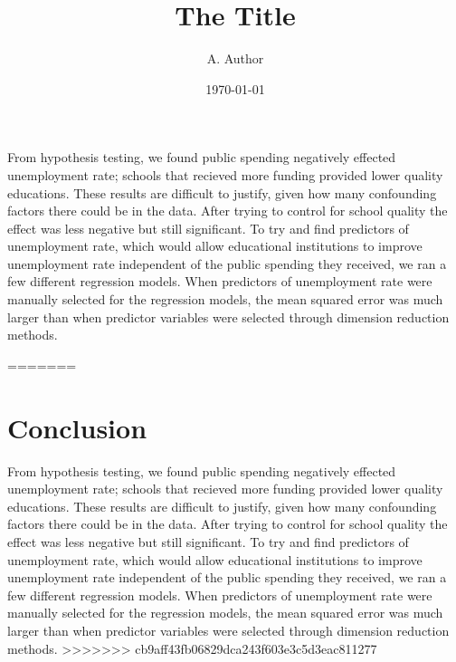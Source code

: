 \documentclass{article}
\begin{document}


\title{The Title}
\author{A. Author}
\date{\today}

\maketitle

From hypothesis testing, we found public spending negatively effected unemployment rate; schools that recieved more funding provided lower quality educations. These results are difficult to justify, given how many confounding factors there could be in the data. After trying to control for school quality the effect was less negative but still significant. To try and find predictors of unemployment rate, which would allow educational institutions to improve unemployment rate independent of the public spending they received, we ran a few different regression models. When predictors of unemployment rate were manually selected for the regression models, the mean squared error was much larger than when predictor variables were selected through dimension reduction methods. 

=======
\maketitle
\section{Conclusion}
From hypothesis testing, we found public spending negatively effected unemployment rate; schools that recieved more funding provided lower quality educations. These results are difficult to justify, given how many confounding factors there could be in the data. After trying to control for school quality the effect was less negative but still significant. To try and find predictors of unemployment rate, which would allow educational institutions to improve unemployment rate independent of the public spending they received, we ran a few different regression models. When predictors of unemployment rate were manually selected for the regression models, the mean squared error was much larger than when predictor variables were selected through dimension reduction methods.
>>>>>>> cb9aff43fb06829dca243f603e3c5d3eac811277
\end{document}
